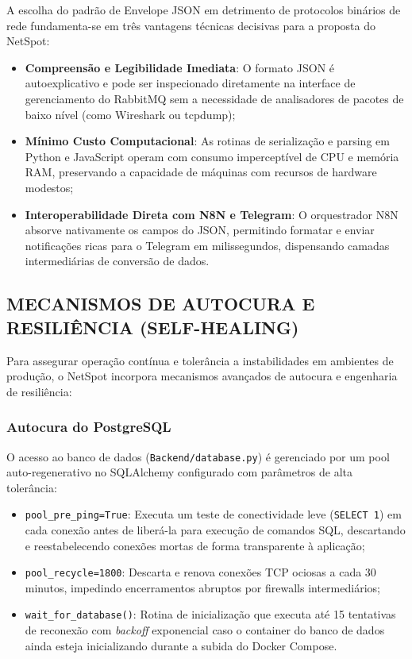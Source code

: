 \documentclass[12pt,a4paper]{article}
\begin{document}
A escolha do padrão de Envelope JSON em detrimento de protocolos binários de rede fundamenta-se em três vantagens técnicas decisivas para a proposta do NetSpot:
\begin{itemize}[leftmargin=1.25cm]
\item \textbf{Compreensão e Legibilidade Imediata}: O formato JSON é autoexplicativo e pode ser inspecionado diretamente na interface de gerenciamento do RabbitMQ sem a necessidade de analisadores de pacotes de baixo nível (como Wireshark ou tcpdump);
\item \textbf{Mínimo Custo Computacional}: As rotinas de serialização e parsing em Python e JavaScript operam com consumo imperceptível de CPU e memória RAM, preservando a capacidade de máquinas com recursos de hardware modestos;
\item \textbf{Interoperabilidade Direta com N8N e Telegram}: O orquestrador N8N absorve nativamente os campos do JSON, permitindo formatar e enviar notificações ricas para o Telegram em milissegundos, dispensando camadas intermediárias de conversão de dados.
\end{itemize}

\subsection{MECANISMOS DE AUTOCURA E RESILIÊNCIA (SELF-HEALING)}
Para assegurar operação contínua e tolerância a instabilidades em ambientes de produção, o NetSpot incorpora mecanismos avançados de autocura e engenharia de resiliência:

\subsubsection{Autocura do PostgreSQL}
O acesso ao banco de dados (\texttt{Backend/database.py}) é gerenciado por um pool auto-regenerativo no SQLAlchemy configurado com parâmetros de alta tolerância:
\begin{itemize}[leftmargin=1.25cm]
\item \texttt{pool\_pre\_ping=True}: Executa um teste de conectividade leve (\texttt{SELECT 1}) em cada conexão antes de liberá-la para execução de comandos SQL, descartando e reestabelecendo conexões mortas de forma transparente à aplicação;
\item \texttt{pool\_recycle=1800}: Descarta e renova conexões TCP ociosas a cada 30 minutos, impedindo encerramentos abruptos por firewalls intermediários;
\item \texttt{wait\_for\_database()}: Rotina de inicialização que executa até 15 tentativas de reconexão com \textit{backoff} exponencial caso o container do banco de dados ainda esteja inicializando durante a subida do Docker Compose.
\end{itemize}
\end{document}
